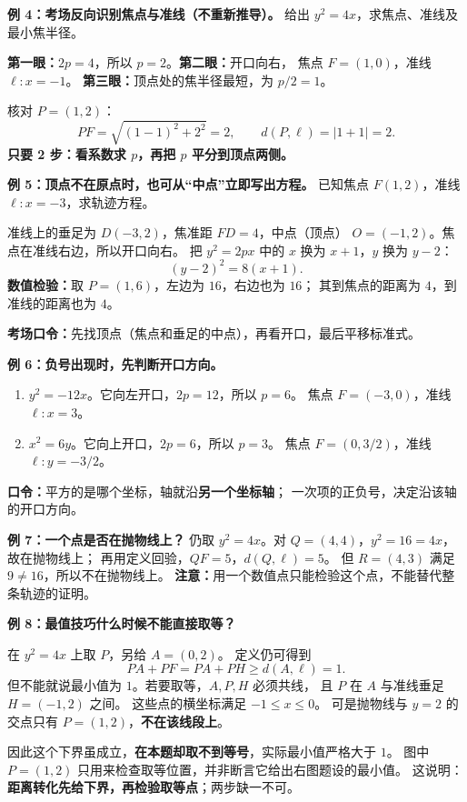 \begin{examplebox}
\textbf{例 4：考场反向识别焦点与准线（不重新推导）。}
给出 $y^2=4x$，求焦点、准线及最小焦半径。

\textbf{第一眼：}$2p=4$，所以 $p=2$。\textbf{第二眼：}开口向右，
焦点 $F=(1,0)$，准线 $\ell:x=-1$。
\textbf{第三眼：}顶点处的焦半径最短，为 $p/2=1$。

核对 $P=(1,2)$：
\[
PF=\sqrt{(1-1)^2+2^2}=2,\qquad d(P,\ell)=|1+1|=2.
\]
\textbf{只要 2 步：看系数求 $p$，再把 $p$ 平分到顶点两侧。}
\end{examplebox}
\clearpage
\begin{examplebox}
\textbf{例 5：顶点不在原点时，也可从“中点”立即写出方程。}
已知焦点 $F(1,2)$，准线 $\ell:x=-3$，求轨迹方程。

准线上的垂足为 $D(-3,2)$，焦准距 $FD=4$，中点（顶点）
$O=(-1,2)$。焦点在准线右边，所以开口向右。
把 $y^2=2px$ 中的 $x$ 换为 $x+1$，$y$ 换为 $y-2$：
\[
\boxed{(y-2)^2=8(x+1)}.
\]
\textbf{数值检验：}取 $P=(1,6)$，左边为 $16$，右边也为 $16$；
其到焦点的距离为 $4$，到准线的距离也为 $4$。

\textbf{考场口令：}先找顶点（焦点和垂足的中点），再看开口，最后平移标准式。
\end{examplebox}
\clearpage
\begin{examplebox}
\textbf{例 6：负号出现时，先判断开口方向。}
\begin{enumerate}[leftmargin=*]
\item $y^2=-12x$。它向左开口，$2p=12$，所以 $p=6$。
焦点 $F=(-3,0)$，准线 $\ell:x=3$。
\item $x^2=6y$。它向上开口，$2p=6$，所以 $p=3$。
焦点 $F=(0,3/2)$，准线 $\ell:y=-3/2$。
\end{enumerate}
\textbf{口令：}平方的是哪个坐标，轴就沿\textbf{另一个坐标轴}；
一次项的正负号，决定沿该轴的开口方向。

\medskip
\textbf{例 7：一个点是否在抛物线上？}
仍取 $y^2=4x$。对 $Q=(4,4)$，$y^2=16=4x$，故在抛物线上；
再用定义回验，$QF=5$，$d(Q,\ell)=5$。
但 $R=(4,3)$ 满足 $9\ne16$，所以不在抛物线上。
\textbf{注意：}用一个数值点只能检验这个点，不能替代整条轨迹的证明。
\end{examplebox}
\clearpage
\begin{examplebox}
\textbf{例 8：最值技巧什么时候不能直接取等？}

在 $y^2=4x$ 上取 $P$，另给 $A=(0,2)$。
定义仍可得到
\[
PA+PF=PA+PH\ge d(A,\ell)=1.
\]
但不能就说最小值为 $1$。若要取等，$A,P,H$ 必须共线，
且 $P$ 在 $A$ 与准线垂足 $H=(-1,2)$ 之间。
这些点的横坐标满足 $-1\le x\le0$。
可是抛物线与 $y=2$ 的交点只有 $P=(1,2)$，\textbf{不在该线段上}。

因此这个下界虽成立，\textbf{在本题却取不到等号}，实际最小值严格大于 $1$。
图中 $P=(1,2)$ 只用来检查取等位置，并非断言它给出右图题设的最小值。
这说明：\textbf{距离转化先给下界，再检验取等点}；两步缺一不可。
\end{examplebox}
